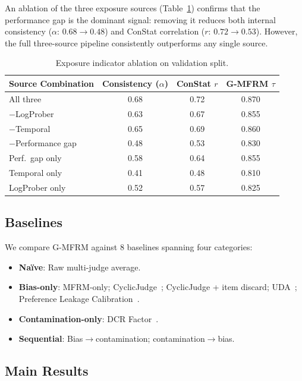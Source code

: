 \documentclass[11pt]{article}
\newcommand{\gmfrm}{\textsc{G-MFRM}}
\begin{document}
An ablation of the three exposure sources (Table~\ref{tab:exposure-ablation}) confirms that the performance gap is the dominant signal: removing it reduces both internal consistency ($\alpha$: $0.68 \to 0.48$) and ConStat correlation ($r$: $0.72 \to 0.53$). However, the full three-source pipeline consistently outperforms any single source.

\begin{table}[t]
\centering
\caption{Exposure indicator ablation on validation split.}
\label{tab:exposure-ablation}
\small
\begin{tabular}{@{}lccc@{}}
\toprule
Source Combination & Consistency ($\alpha$) & ConStat $r$ & \gmfrm{} $\tau$ \\
\midrule
All three & 0.68 & 0.72 & 0.870 \\
$-$LogProber & 0.63 & 0.67 & 0.855 \\
$-$Temporal & 0.65 & 0.69 & 0.860 \\
$-$Performance gap & 0.48 & 0.53 & 0.830 \\
\midrule
Perf.\ gap only & 0.58 & 0.64 & 0.855 \\
Temporal only & 0.41 & 0.48 & 0.810 \\
LogProber only & 0.52 & 0.57 & 0.825 \\
\bottomrule
\end{tabular}
\end{table}

\subsection{Baselines}

We compare \gmfrm{} against 8 baselines spanning four categories:
\begin{itemize}[nosep,leftmargin=*]
\item \textbf{Na\"ive}: Raw multi-judge average.
\item \textbf{Bias-only}: MFRM-only; CyclicJudge~\citep{li2024cyclicjudge}; CyclicJudge + item discard; UDA~\citep{wu2024uda}; Preference Leakage Calibration~\citep{raina2024preferenceleakage}.
\item \textbf{Contamination-only}: DCR Factor~\citep{dekoninck2024constat}.
\item \textbf{Sequential}: Bias$\to$contamination; contamination$\to$bias.
\end{itemize}

\subsection{Main Results}
\label{sec:main-results}
\end{document}
